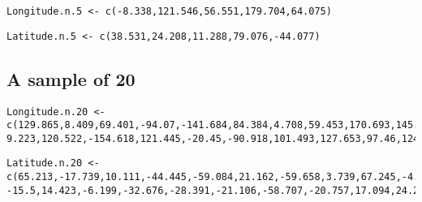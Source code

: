 \documentclass[letterpaper,9pt,twoside,printwatermark=false]{pinp}
\begin{document}
\begin{ShadedResult}
\begin{verbatim}
Longitude.n.5 <- c(-8.338,121.546,56.551,179.704,64.075)
\end{verbatim}
\end{ShadedResult}\begin{ShadedResult}
\begin{verbatim}
Latitude.n.5 <- c(38.531,24.208,11.288,79.076,-44.077)
\end{verbatim}
\end{ShadedResult}

\subsection*{A sample of 20}\label{a-sample-of-20}

\begin{ShadedResult}
\begin{verbatim}
Longitude.n.20 <- c(129.865,8.409,69.401,-94.07,-141.684,84.384,4.708,59.453,170.693,145.75,
9.223,120.522,-154.618,121.445,-20.45,-90.918,101.493,127.653,97.46,124.264)
\end{verbatim}
\end{ShadedResult}\begin{ShadedResult}
\begin{verbatim}
Latitude.n.20 <- c(65.213,-17.739,10.111,-44.445,-59.084,21.162,-59.658,3.739,67.245,-4.353,
-15.5,14.423,-6.199,-32.676,-28.391,-21.106,-58.707,-20.757,17.094,24.236)
\end{verbatim}
\end{ShadedResult}





\end{document}
